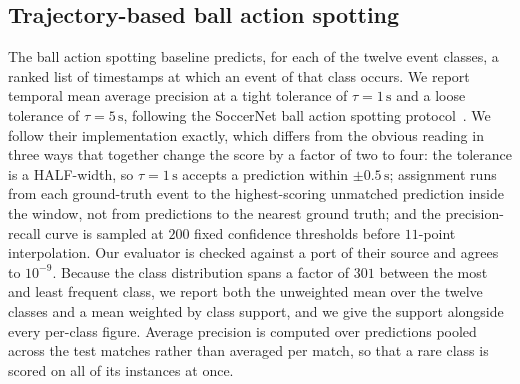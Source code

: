 %
%



\subsection{Trajectory-based ball action spotting}
\label{subsec:methods_bas_traj}

The ball action spotting baseline predicts, for each of the twelve event classes, a ranked
list of timestamps at which an event of that class occurs. We report temporal mean average
precision at a tight tolerance of $\tau = 1\,\text{s}$ and a loose tolerance of
$\tau = 5\,\text{s}$, following the SoccerNet ball action spotting
protocol~\cite{giancola2018soccernet,deliege2021soccernet}. We follow their implementation
exactly, which differs from the obvious reading in three ways that together change the score
by a factor of two to four: the tolerance is a HALF-width, so $\tau = 1\,\text{s}$ accepts a
prediction within $\pm 0.5\,\text{s}$; assignment runs from each ground-truth event to the
highest-scoring unmatched prediction inside the window, not from predictions to the nearest
ground truth; and the precision-recall curve is sampled at $200$ fixed confidence thresholds
before $11$-point interpolation. Our evaluator is checked against a port of their source and
agrees to $10^{-9}$. Because the class distribution spans a factor of $301$ between the
most and least frequent class, we report both the unweighted mean over the twelve classes and
a mean weighted by class support, and we give the support alongside every per-class figure.
Average precision is computed over predictions pooled across the test matches rather than
averaged per match, so that a rare class is scored on all of its instances at once.

